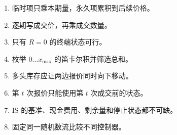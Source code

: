 \begin{enumerate}[leftmargin=*]
  \item 临时项只乘本期量，永久项累积到后续价格。
  \item 逐期写成交价，再乘成交数量。
  \item 只有 $R=0$ 的终端状态可行。
  \item 枚举 $0\ldots x_{\max}$ 的笛卡尔积并筛选总和。
  \item 多头库存应让两边报价同时向下移动。
  \item 第 $t$ 次报价只能使用第 $t$ 次成交前的状态。
  \item IS 的基准、现金费用、剩余量和停止状态都不可缺。
  \item 固定同一随机数流比较不同控制器。
\end{enumerate}

